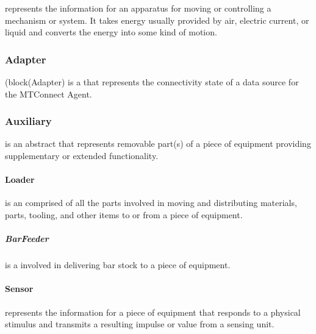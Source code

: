  represents the information for an apparatus for moving or controlling a mechanism or system. It takes energy usually provided by air, electric current, or liquid and converts the energy into some kind of motion.



\subsubsection{Adapter}
\label{sec:Adapter}



{{(block(Adapter)}} is a  that represents the connectivity state of a data source for the \gls{MTConnect Agent}.



\subsubsection{Auxiliary}
\label{sec:Auxiliary}



 is an abstract  that represents removable part(s) of a piece of equipment providing supplementary or extended functionality.



\paragraph{Loader}\mbox{}
\label{sec:Loader}


 is an  comprised of all the parts involved in moving and distributing materials, parts, tooling, and other items to or from a piece of equipment.



\subparagraph{BarFeeder}\mbox{}
\label{sec:BarFeeder}


 is a  involved in delivering bar stock to a piece of equipment.



\paragraph{Sensor}\mbox{}
\label{sec:Sensor}


 represents the information for a piece of equipment that responds to a physical stimulus and transmits a resulting impulse or value from a sensing unit.



